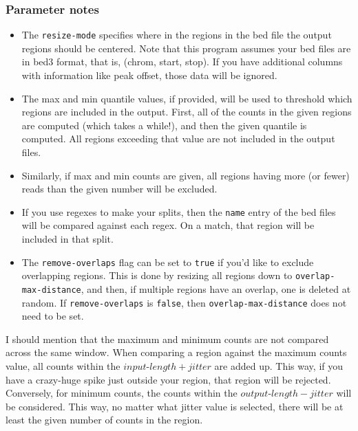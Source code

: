 \documentclass{article}
\begin{document}
\subsubsection{Parameter notes}

\begin{itemize}
    \item The \texttt{resize-mode} specifies where in the regions in the bed file the output
        regions should be centered. Note that this program assumes your bed files are in bed3
        format, that is, (chrom, start, stop). If you have additional columns with information
        like peak offset, those data will be ignored.
    \item The max and min quantile values, if provided, will be used to threshold which regions
        are included in the output. First, all of the counts in the given regions are computed
        (which takes a while!), and then the given quantile is computed. All regions exceeding
        that value are not included in the output files.
    \item Similarly, if max and min counts are given, all regions having more (or fewer) reads
        than the given number will be excluded.
    \item If you use regexes to make your splits, then the \texttt{name} entry of the bed files
        will be compared against each regex.
        On a match, that region will be included in that split.
    \item The \texttt{remove-overlaps} flag can be set to \texttt{true} if you'd like to exclude
        overlapping regions. This is done by resizing all regions down to
        \texttt{overlap-max-distance}, and then, if multiple regions have an overlap,
        one is deleted at random.
        If \texttt{remove-overlaps} is \texttt{false}, then \texttt{overlap-max-distance}
        does not need to be set.
\end{itemize}

I should mention that the maximum and minimum counts are not compared across the same window.
When comparing a region against the maximum counts value, all counts within the
$input\mbox{-}length + jitter$ are added up. This way, if you have a crazy-huge spike just outside
your region, that region will be rejected.
Conversely, for minimum counts, the counts within the $output\mbox{-}length - jitter$ will be
considered. This way, no matter what jitter value is selected, there will be at least the
given number of counts in the region.
\end{document}
